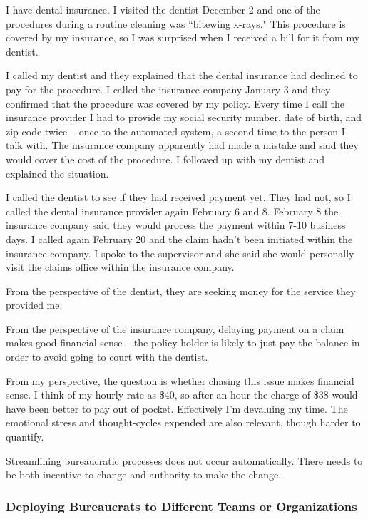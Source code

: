 
I have dental insurance. I visited the dentist December 2 and one of the procedures during a routine cleaning was ``bitewing x-rays." This procedure is covered by my insurance, so I was surprised when I received a bill for it from my dentist.

I called my dentist and they explained that the dental insurance had declined to pay for the procedure. I called the insurance company January 3 and they confirmed that the procedure was covered by my policy. 
Every time I call the insurance provider I had to provide my social security number, date of birth, and zip code twice -- once to the automated system, a second time to the person I talk with. The insurance company apparently had made a mistake and said they would cover the cost of the procedure. I followed up with my dentist and explained the situation.

I called the dentist to see if they had received payment yet. They had not, so I called the dental insurance provider again February 6 and 8. February 8 the insurance company said they would process the payment within 7-10 business days. I called again February 20 and the claim hadn't been initiated within the insurance company. I spoke to the supervisor and she said she would personally visit the claims office within the insurance company.

From the perspective of the dentist, they are seeking money for the service they provided me.

From the perspective of the insurance company, delaying payment on a claim makes good financial sense -- the policy holder is likely to just pay the balance in order to avoid going to court with the dentist.

From my perspective, the question is whether chasing this issue makes financial sense. I think of my hourly rate as \$40, so after an hour the charge of \$38 would have been better to pay out of pocket. Effectively I'm devaluing my time. The emotional stress and thought-cycles expended are also relevant, though harder to quantify.

Streamlining bureaucratic processes does not occur automatically. There needs to be both incentive to change and authority to make the change. 

\subsubsection{Deploying Bureaucrats to Different Teams or Organizations\label{sec:prisoner_exchange}}

